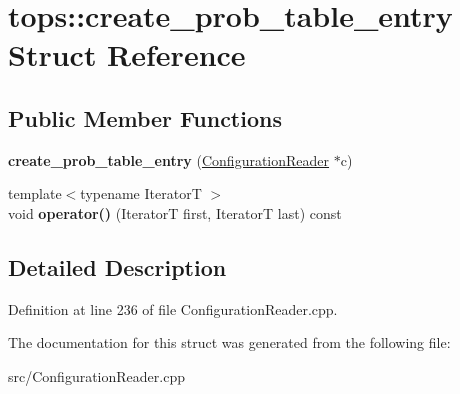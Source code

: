 \hypertarget{structtops_1_1create__prob__table__entry}{}\section{tops\+:\+:create\+\_\+prob\+\_\+table\+\_\+entry Struct Reference}
\label{structtops_1_1create__prob__table__entry}
\subsection*{Public Member Functions}
\begin{DoxyCompactItemize}
\item 
\mbox{\label{structtops_1_1create__prob__table__entry_a6fa291751c369b5e68bc48adf637fa52}} 
{\bfseries create\+\_\+prob\+\_\+table\+\_\+entry} (\hyperlink{classtops_1_1ConfigurationReader}{Configuration\+Reader} $\ast$c)
\item 
\mbox{\label{structtops_1_1create__prob__table__entry_aea174c0990f2a8808e02c310f03c9be3}} 
{\footnotesize template$<$typename IteratorT $>$ }\\void {\bfseries operator()} (IteratorT first, IteratorT last) const
\end{DoxyCompactItemize}


\subsection{Detailed Description}


Definition at line 236 of file Configuration\+Reader.\+cpp.



The documentation for this struct was generated from the following file\+:\begin{DoxyCompactItemize}
\item 
src/Configuration\+Reader.\+cpp\end{DoxyCompactItemize}
